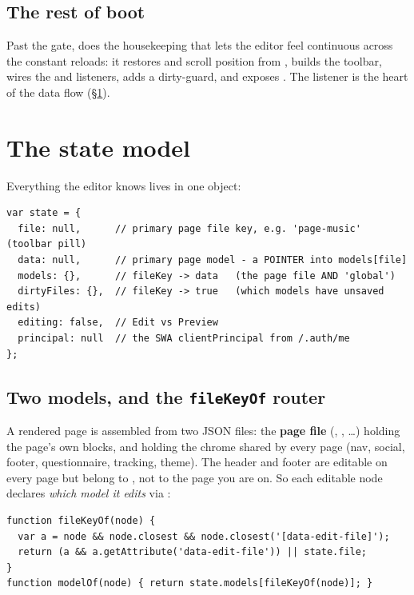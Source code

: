 \documentclass[11pt]{article}
\begin{document}
\subsection{The rest of boot}

Past the gate,  does the housekeeping that lets the editor feel
continuous across the constant reloads: it restores  and
scroll position from , builds the toolbar, wires the
 and  listeners, adds a
 dirty-guard, and exposes . The
 listener is the heart of the data flow (\S\ref{sec:state}).

\section{The state model}\label{sec:state}

Everything the editor knows lives in one object:

\begin{lstlisting}
var state = {
  file: null,      // primary page file key, e.g. 'page-music' (toolbar pill)
  data: null,      // primary page model - a POINTER into models[file]
  models: {},      // fileKey -> data   (the page file AND 'global')
  dirtyFiles: {},  // fileKey -> true   (which models have unsaved edits)
  editing: false,  // Edit vs Preview
  principal: null  // the SWA clientPrincipal from /.auth/me
};
\end{lstlisting}

\subsection{Two models, and the \texttt{fileKeyOf} router}

A rendered page is assembled from two JSON files: the \textbf{page file}
(, , \dots) holding the page's own blocks,
and \textbf{} holding the chrome shared by every page (nav,
social, footer, questionnaire, tracking, theme). The header and footer are
editable on every page but belong to , not to the page you are on.
So each editable node declares \emph{which model it edits} via :

\begin{lstlisting}
function fileKeyOf(node) {
  var a = node && node.closest && node.closest('[data-edit-file]');
  return (a && a.getAttribute('data-edit-file')) || state.file;
}
function modelOf(node) { return state.models[fileKeyOf(node)]; }
\end{lstlisting}
\end{document}
